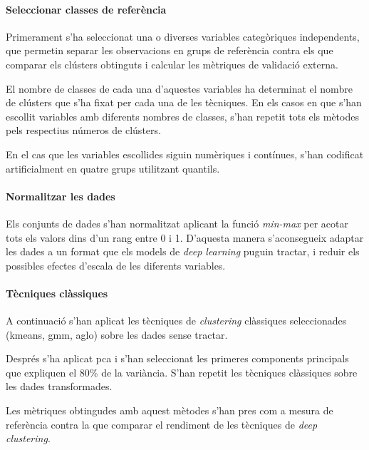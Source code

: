\documentclass[CAT,BIB]{TFUOC}%
\begin{document}
    \paragraph{Seleccionar classes de referència}
        Primerament s'ha seleccionat una o diverses variables categòriques independents,
        que permetin separar les observacions en grups de referència
        contra els que comparar els clústers obtinguts
        i calcular les mètriques de validació externa.

        El nombre de classes de cada una d'aquestes variables
        ha determinat el nombre de clústers que s'ha fixat per cada una de les tècniques.
        En els casos en que s'han escollit variables amb diferents nombres de classes,
        s'han repetit tots els mètodes pels respectius números de clústers.

        En el cas que les variables escollides siguin numèriques i contínues,
        s'han codificat artificialment en quatre grups utilitzant quantils.

    \paragraph{Normalitzar les dades}
        Els conjunts de dades s'han normalitzat
        aplicant la funció \textit{min-max}
        per acotar tots els valors dins d'un rang entre 0 i 1.
        D'aquesta manera s'aconsegueix
        adaptar les dades a un format que els models de \textit{deep learning} puguin tractar,
        i reduir els possibles efectes d'escala de les diferents variables.

    \paragraph{Tècniques clàssiques}
        A continuació
        s'han aplicat les tècniques de \textit{clustering} clàssiques seleccionades
        (\gls{kmeans}, \gls{gmm}, \gls{aglo})
        sobre les dades sense tractar.

        Després s'ha aplicat \gls{pca}
        i s'han seleccionat les primeres components principals
        que expliquen el 80\% de la variància.
        S'han repetit les tècniques clàssiques
        sobre les dades transformades.

        Les mètriques obtingudes amb aquest mètodes
        s'han pres com a mesura de referència
        contra la que comparar el rendiment de les tècniques de \textit{deep clustering}.
\end{document}
